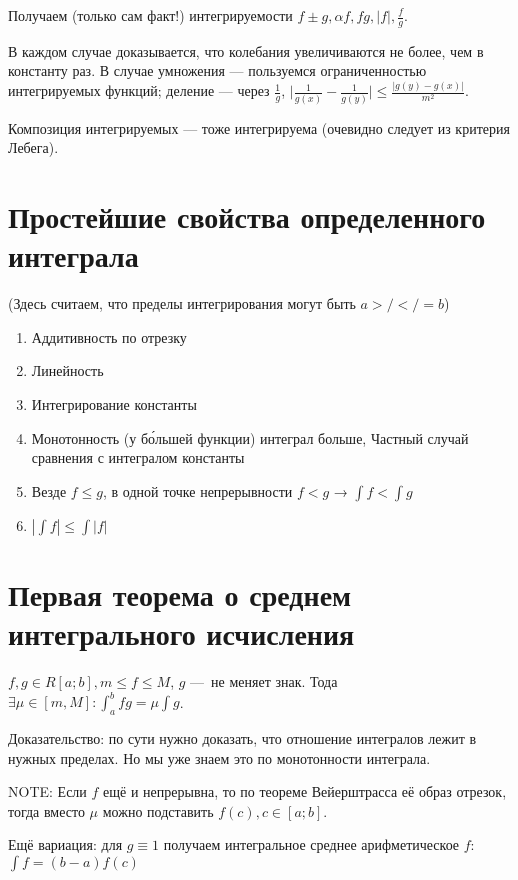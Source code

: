 \documentclass[12pt, a4paper]{article}
\begin{document}
    Получаем (только сам факт!) интегрируемости $f ± g, \alpha f, fg, |f|, \frac{f}{g}$.

    В каждом случае доказывается, что колебания увеличиваются не более, чем в константу раз.
    В случае умножения — пользуемся ограниченностью интегрируемых функций; деление — через $\frac{1}{g}$,
    $\Big|\frac{1}{g(x)} - \frac{1}{g(y)}\Big| \leqslant \frac{|g(y) - g(x)|}{m^2}$.

    Композиция интегрируемых — тоже интегрируема (очевидно следует из критерия Лебега).

\section{Простейшие свойства определенного интеграла}

    (Здесь считаем, что пределы интегрирования могут быть $a >/</=b$)

    \begin{enumerate}
        \item Аддитивность по отрезку
        \item Линейность
        \item Интегрирование константы
        \item Монотонность (у б\'{о}льшей функции) интеграл больше, Частный случай сравнения с интегралом константы
        \item Везде $f \leqslant g$, в одной точке непрерывности $f < g$ → $\int f < \int g$
        \item $\left| \int f \right| \leqslant \int |f|$
    \end{enumerate}

\section{Первая теорема о среднем интегрального исчисления}

    $f, g \in R[a; b], m \leqslant f \leqslant M$, $g$ — не меняет знак.
    Тода $\exists \mu \in [m, M]: \int_a^b fg = \mu \int g$.

    Доказательство: по сути нужно доказать, что отношение интегралов лежит в нужных пределах.
    Но мы уже знаем это по монотонности интеграла.

    \splitdoc

    NOTE: Если $f$ ещё и непрерывна, то по теореме Вейерштрасса её образ отрезок, тогда вместо $\mu$ можно подставить $f(c), c \in [a; b]$.

    Ещё вариация: для $g \equiv 1$ получаем интегральное среднее арифметическое $f$: $\int f = (b - a) f(c)$
\end{document}
